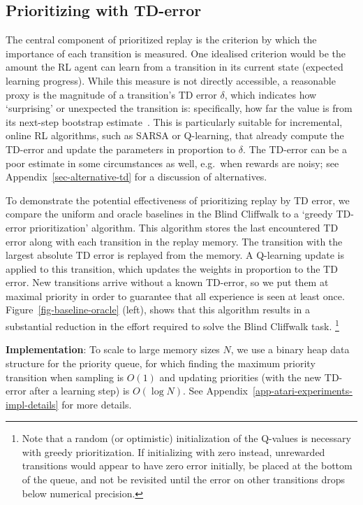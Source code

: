 \documentclass[a4paper]{article}
\begin{document}
\subsection{Prioritizing with TD-error}
The central component of prioritized replay is the criterion by which the importance of each transition is measured. 
One idealised criterion would be the amount the RL agent
can learn from a transition in its current state (expected learning progress). 
While this measure is not directly accessible, a reasonable proxy is the magnitude of 
a transition's TD error $\delta$, which indicates how `surprising' or unexpected the transition is: specifically, how far the value is from its next-step bootstrap estimate~\citep{gen-sweeping}.
This is particularly suitable for incremental, online RL algorithms, such as SARSA or Q-learning, that already compute the TD-error and update
the parameters in proportion to $\delta$.
The TD-error can be a poor estimate in some circumstances as well, e.g.~when rewards are noisy; 
see Appendix~\ref{sec-alternative-td} for a discussion of alternatives.


To demonstrate the potential effectiveness of prioritizing replay by TD error, 
we compare the uniform and oracle baselines in the Blind Cliffwalk to 
a `greedy TD-error prioritization' algorithm. This algorithm stores the last encountered TD error along with each transition in the replay memory. The transition with the largest absolute TD error is replayed from the memory. A Q-learning update is applied to this transition, which updates the weights in proportion to the TD error. 
New transitions arrive without a known TD-error, so we put them at maximal priority in order to guarantee that
all experience is seen at least once. 
Figure~\ref{fig-baseline-oracle} (left), shows that this algorithm results in a substantial reduction in the effort required to solve the Blind Cliffwalk task.%
\footnote{
Note that a random (or optimistic) initialization of the Q-values is necessary with greedy prioritization.
If initializing with zero instead, unrewarded transitions would appear to have zero error initially, be placed at the bottom of the queue, and not be revisited until the error on other transitions drops below numerical precision.
}

{\bf Implementation}: To scale to large memory sizes $N$,
we use a binary heap data structure for the priority queue, for which 
finding the maximum priority transition when sampling is $O(1)$
and updating priorities (with the new TD-error after a learning step) is $O(\log N)$.
See Appendix~\ref{app-atari-experiments-impl-details} for more details.
\end{document}
